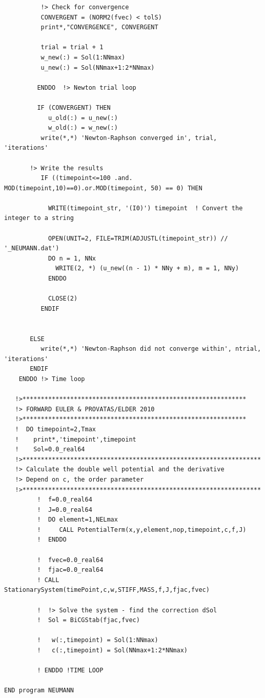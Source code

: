 \documentclass{article}
\begin{document}
\begin{verbatim}
          !> Check for convergence
          CONVERGENT = (NORM2(fvec) < tolS)
          print*,"CONVERGENCE", CONVERGENT
 
          trial = trial + 1
          w_new(:) = Sol(1:NNmax)
          u_new(:) = Sol(NNmax+1:2*NNmax)
          
         ENDDO  !> Newton trial loop
         
         IF (CONVERGENT) THEN
            u_old(:) = u_new(:)
            w_old(:) = w_new(:)
          write(*,*) 'Newton-Raphson converged in', trial, 'iterations'

       !> Write the results
          IF ((timepoint<=100 .and. MOD(timepoint,10)==0).or.MOD(timepoint, 50) == 0) THEN
            
            WRITE(timepoint_str, '(I0)') timepoint  ! Convert the integer to a string
          
            OPEN(UNIT=2, FILE=TRIM(ADJUSTL(timepoint_str)) // '_NEUMANN.dat')
            DO n = 1, NNx
              WRITE(2, *) (u_new((n - 1) * NNy + m), m = 1, NNy)
            ENDDO
          
            CLOSE(2)
          ENDIF
          

       ELSE
          write(*,*) 'Newton-Raphson did not converge within', ntrial, 'iterations'
       ENDIF
    ENDDO !> Time loop

   !>*************************************************************
   !> FORWARD EULER & PROVATAS/ELDER 2010
   !>*************************************************************  
   !  DO timepoint=2,Tmax
   !    print*,'timepoint',timepoint
   !    Sol=0.0_real64
   !>*****************************************************************
   !> Calculate the double well potential and the derivative
   !> Depend on c, the order parameter
   !>*****************************************************************
         !  f=0.0_real64
         !  J=0.0_real64
         !  DO element=1,NELmax
         !     CALL PotentialTerm(x,y,element,nop,timepoint,c,f,J)
         !  ENDDO

         !  fvec=0.0_real64
         !  fjac=0.0_real64
         ! CALL StationarySystem(timePoint,c,w,STIFF,MASS,f,J,fjac,fvec)
 
         !  !> Solve the system - find the correction dSol
         !  Sol = BiCGStab(fjac,fvec)

         !   w(:,timepoint) = Sol(1:NNmax)
         !   c(:,timepoint) = Sol(NNmax+1:2*NNmax)

         ! ENDDO !TIME LOOP     

END program NEUMANN
\end{verbatim}
\end{document}
